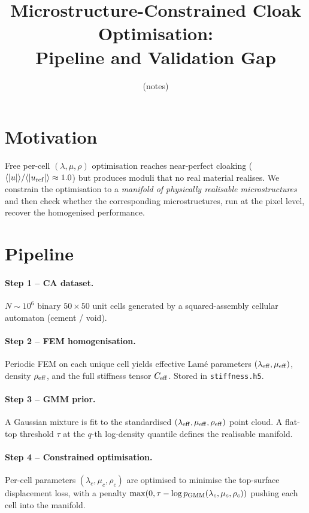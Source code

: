 \documentclass[11pt,a4paper]{article}
\title{Microstructure-Constrained Cloak Optimisation:\\
Pipeline and Validation Gap}
\author{(notes)}
\date{}
\begin{document}
\maketitle

\section{Motivation}
Free per-cell $(\lambda,\mu,\rho)$ optimisation reaches near-perfect cloaking
($\langle|u|\rangle/\langle|u_{\rm ref}|\rangle \approx 1.0$) but produces
moduli that no real material realises. We constrain the optimisation to a
\emph{manifold of physically realisable microstructures} and then check
whether the corresponding microstructures, run at the pixel level, recover
the homogenised performance.

\section{Pipeline}

\paragraph{Step 1 -- CA dataset.}
$N{\sim}10^{6}$ binary $50\times 50$ unit cells generated by a
squared-assembly cellular automaton (cement / void).

\paragraph{Step 2 -- FEM homogenisation.}
Periodic FEM on each unique cell yields effective Lam\'e parameters
$(\lambda_{\rm eff},\mu_{\rm eff})$, density $\rho_{\rm eff}$, and the full
stiffness tensor $C_{\rm eff}$. Stored in \texttt{stiffness.h5}.

\paragraph{Step 3 -- GMM prior.}
A Gaussian mixture is fit to the standardised
$(\lambda_{\rm eff},\mu_{\rm eff},\rho_{\rm eff})$ point cloud. A flat-top
threshold $\tau$ at the $q$-th log-density quantile defines the realisable
manifold.

\paragraph{Step 4 -- Constrained optimisation.}
Per-cell parameters $(\lambda_c,\mu_c,\rho_c)$ are optimised to minimise the
top-surface displacement loss, with a penalty
$\max(0,\tau-\log p_{\rm GMM}(\lambda_c,\mu_c,\rho_c))$ pushing each cell
into the manifold.
\end{document}
